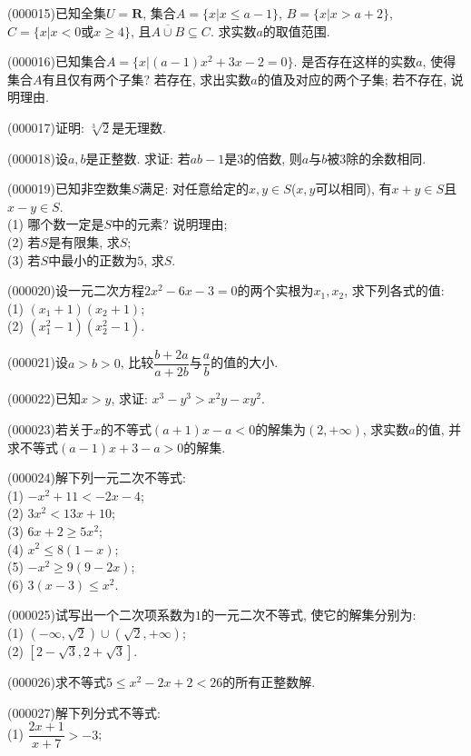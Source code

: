 \item (000015)已知全集$U=\mathbf{R}$, 集合$A=\{x|x\le a-1\}$, $B=\{x|x>a+2\}$, $C=\{x|x<0\text{或}x\ge 4\}$, 且$\overline{A\cup B}\subseteq C$. 求实数$a$的取值范围.
\item (000016)已知集合$A=\{x|(a-1)x^2+3x-2=0\}$. 是否存在这样的实数$a$, 使得集合$A$有且仅有两个子集? 若存在, 求出实数$a$的值及对应的两个子集; 若不存在, 说明理由.
\item (000017)证明: $\sqrt[3]{2}$是无理数.
\item (000018)设$a,b$是正整数. 求证: 若$ab-1$是$3$的倍数, 则$a$与$b$被$3$除的余数相同.
\item (000019)已知非空数集$S$满足: 对任意给定的$x,y\in S$($x,y$可以相同), 有$x+y\in S$且$x-y\in S$.\\
(1) 哪个数一定是$S$中的元素? 说明理由;\\
(2) 若$S$是有限集, 求$S$;\\
(3) 若$S$中最小的正数为$5$, 求$S$.
\item (000020)设一元二次方程$2x^2-6x-3=0$的两个实根为$x_1,x_2$, 求下列各式的值:\\
(1) $(x_1+1)(x_2+1)$;\\
(2) $(x_1^2-1)(x_2^2-1)$.
\item (000021)设$a>b>0$, 比较$\dfrac{b+2a}{a+2b}$与$\dfrac ab$的值的大小.
\item (000022)已知$x>y$, 求证: $x^3-y^3>x^2y-xy^2$.
\item (000023)若关于$x$的不等式$(a+1)x-a<0$的解集为$(2,+\infty)$, 求实数$a$的值, 并求不等式$(a-1)x+3-a>0$的解集.
\item (000024)解下列一元二次不等式:\\
(1) $-x^2+11<-2x-4$;\\
(2) $3x^2<13x+10$;\\
(3) $6x+2\ge 5x^2$;\\
(4) $x^2\le 8(1-x)$;\\
(5) $-x^2\ge 9(9-2x)$;\\
(6) $3(x-3)\le x^2$.
\item (000025)试写出一个二次项系数为$1$的一元二次不等式, 使它的解集分别为:\\
(1) $(-\infty, \sqrt 2)\cup  (\sqrt 2, +\infty)$;\\
(2) $[2-\sqrt 3, 2+\sqrt 3]$.
\item (000026)求不等式$5\le x^2-2x+2<26$的所有正整数解.
\item (000027)解下列分式不等式:\\
(1) $\dfrac{2x+1}{x+7}>-3$;\\
